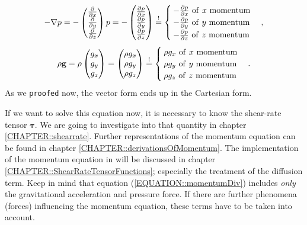 \documentclass[MathematicsNumericsDerivationsAndOpenFOAM.tex]{subfiles}
\begin{document}
\begin{equation*}
  -  \nabla p
=
  -
  \left(
  \begin{matrix}
   \frac{\partial}{\partial x} \\
   \frac{\partial}{\partial y} \\
   \frac{\partial}{\partial z}
  \end{matrix}
  \right) p
=
-
  \left(
  \begin{matrix}
   \frac{\partial p}{\partial x} \\
   \frac{\partial p}{\partial y} \\
   \frac{\partial p}{\partial z}
  \end{matrix}
  \right)
\overset{!}{=}
  \begin{cases}
  -\frac{\partial p}{\partial x} ~ \mathrm{of~}x ~ \mathrm{momentum} \\
  -\frac{\partial p}{\partial y} ~ \mathrm{of~}y ~ \mathrm{momentum} \\
  -\frac{\partial p}{\partial z} ~ \mathrm{of~}z ~ \mathrm{momentum}
  \end{cases},
\end{equation*}
\begin{equation*}
  \rho \textbf{g}
=
  \rho
  \left(
  \begin{matrix}
    g_x \\
    g_y \\
    g_z
  \end{matrix}
  \right)
=
  \left(
  \begin{matrix}
    \rho g_x \\
    \rho g_y \\
    \rho g_z
  \end{matrix}
  \right)
\overset{!}{=}
  \begin{cases}
  \rho g_x ~ \mathrm{of~}x ~ \mathrm{momentum} \\
  \rho g_y ~ \mathrm{of~}y ~ \mathrm{momentum} \\
  \rho g_z ~ \mathrm{of~}z ~ \mathrm{momentum}
  \end{cases} .
\end{equation*}
%
%
	 As we \texttt{proofed} now, the vector form ends up in the Cartesian form.

     If we want to solve this equation now, it is necessary to know the
     shear-rate tensor $\boldsymbol \tau$. We are going to investigate into that
     quantity in chapter \ref{CHAPTER::shearrate}. Further representations of
     the momentum equation can be found in chapter
     \ref{CHAPTER::derivationsOfMomentum}. The implementation of the momentum
     equation in \OF will be discussed in chapter
     \ref{CHAPTER::ShearRateTensorFunctions}; especially the treatment of the
     diffusion term.  Keep in mind that equation (\ref{EQUATION::momentumDiv})
     includes \textit{only} the gravitational acceleration and pressure force.
     If there are further phenomena (forces) influencing the momentum equation,
     these terms have to be taken into account.
%
%
%
\end{document}
